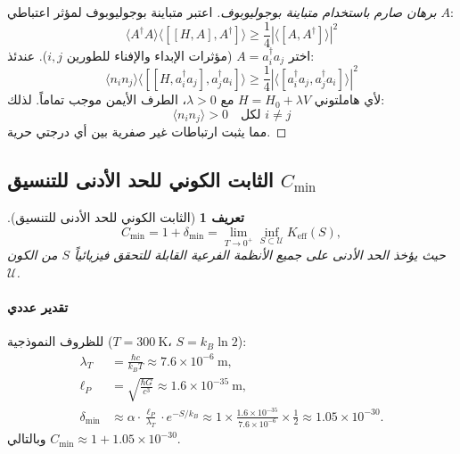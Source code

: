 \documentclass[11pt,a4paper]{article}
\newtheorem{definition}{تعريف}
\begin{document}
	\begin{proof}[برهان صارم باستخدام متباينة بوجوليوبوف]
		اعتبر متباينة بوجوليوبوف لمؤثر اعتباطي $A$:
		\begin{equation}
			\langle A^\dagger A \rangle \langle [[H, A], A^\dagger] \rangle \geq \frac{1}{4} |\langle [A, A^\dagger] \rangle|^2
		\end{equation}
		اختر $A = a_i^\dagger a_j$ (مؤثرات الإبداء والإفناء للطورين $i,j$). عندئذ:
		\begin{equation}
			\langle n_i n_j \rangle \langle [[H, a_i^\dagger a_j], a_j^\dagger a_i] \rangle \geq \frac{1}{4} |\langle [a_i^\dagger a_j, a_j^\dagger a_i] \rangle|^2
		\end{equation}
		لأي هاملتوني $H = H_0 + \lambda V$ مع $\lambda > 0$، الطرف الأيمن موجب تماماً. لذلك:
		\begin{equation}
			\langle n_i n_j \rangle > 0 \quad \text{لكل } i \neq j
		\end{equation}
		مما يثبت ارتباطات غير صفرية بين أي درجتي حرية.
	\end{proof}
	
	\subsection{الثابت الكوني للحد الأدنى للتنسيق $C_{\min}$}
	
	\begin{definition}[الثابت الكوني للحد الأدنى للتنسيق]
		\[
		C_{\min} = 1 + \delta_{\min} = \lim_{T \to 0^+} \inf_{S \subset \mathcal{U}} K_{\mathrm{eff}}(S),
		\]
		حيث يؤخذ الحد الأدنى على جميع الأنظمة الفرعية القابلة للتحقق فيزيائياً $S$ من الكون $\mathcal{U}$.
	\end{definition}
	
	\paragraph{تقدير عددي}
	للظروف النموذجية ($T = 300\ \mathrm{K}$، $S = k_B \ln 2$):
	\begin{align}
		\lambda_T &= \frac{\hbar c}{k_B T} \approx 7.6 \times 10^{-6}\ \mathrm{m},\\[2pt]
		\ell_P &= \sqrt{\frac{\hbar G}{c^3}} \approx 1.6 \times 10^{-35}\ \mathrm{m},\\[2pt]
		\delta_{\min} &\approx \alpha \cdot \frac{\ell_P}{\lambda_T} \cdot e^{-S/k_B}
		\approx 1 \times \frac{1.6 \times 10^{-35}}{7.6 \times 10^{-6}} \times \frac{1}{2}
		\approx 1.05 \times 10^{-30}.
	\end{align}
	وبالتالي $C_{\min} \approx 1 + 1.05 \times 10^{-30}$.
	
\end{document}
